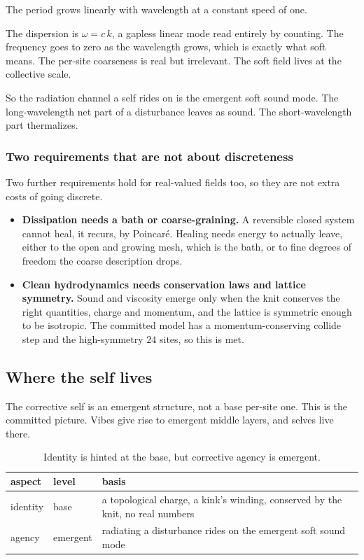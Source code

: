 The period grows linearly with wavelength at a constant speed of one.

\begin{result}
The dispersion is $\omega = c\,k$, a gapless linear mode read entirely by counting. The frequency goes to zero as
the wavelength grows, which is exactly what soft means. The per-site coarseness is real but irrelevant. The soft
field lives at the collective scale.
\end{result}

So the radiation channel a self rides on is the emergent soft sound mode. The long-wavelength net part of a
disturbance leaves as sound. The short-wavelength part thermalizes.

\subsubsection{Two requirements that are not about discreteness}

Two further requirements hold for real-valued fields too, so they are not extra costs of going discrete.

\begin{itemize}
\item \textbf{Dissipation needs a bath or coarse-graining.} A reversible closed system cannot heal, it recurs, by
Poincar\'e. Healing needs energy to actually leave, either to the open and growing mesh, which is the bath, or to
fine degrees of freedom the coarse description drops.
\item \textbf{Clean hydrodynamics needs conservation laws and lattice symmetry.} Sound and viscosity emerge only
when the knit conserves the right quantities, charge and momentum, and the lattice is symmetric enough to be
isotropic. The committed model has a momentum-conserving collide step and the high-symmetry $24$ sites, so this
is met.
\end{itemize}

\subsection{Where the self lives}

The corrective self is an emergent structure, not a base per-site one. This is the committed picture. Vibes give
rise to emergent middle layers, and selves live there.

\begin{table}[ht]
\centering
\begin{tabular}{@{}llp{}@{}}
\toprule
aspect & level & basis \\
\midrule
identity & base & a topological charge, a kink's winding, conserved by the knit, no real numbers \\
agency & emergent & radiating a disturbance rides on the emergent soft sound mode \\
\bottomrule
\end{tabular}
\caption{Identity is hinted at the base, but corrective agency is emergent.}
\label{tab:where-self}
\end{table}

